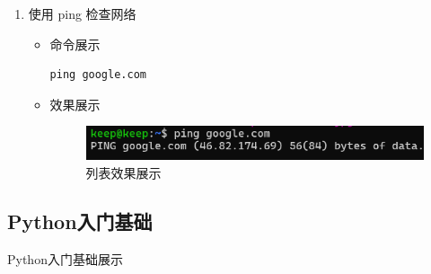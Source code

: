 \documentclass[UTF8]{ctexart}
\begin{document}
\begin{enumerate}
  \item 使用 ping 检查网络
  \begin{itemize}
  \item 命令展示
  \begin{verbatim}
ping google.com
  \end{verbatim}
\item 效果展示
  \begin{figure}[H]
    \centering
    \includegraphics[width=\textwidth]{101} %
    \caption{列表效果展示}
  \end{figure}
  \end{itemize}
\end{enumerate}


































































  \subsection{Python入门基础}
  {\color{blue}Python入门基础展示}
\end{document}
